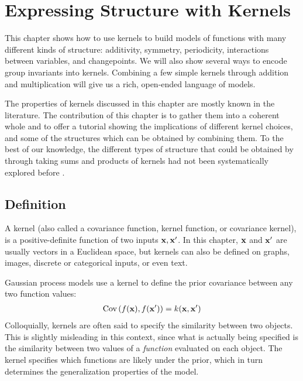 
\inbpdocument

\chapter{Expressing Structure with Kernels}
\label{ch:kernels}

This chapter shows how to use kernels to build models of functions with many different kinds of structure: additivity, symmetry, periodicity, interactions between variables, and changepoints.
We will also show several ways to encode group invariants into kernels.
Combining a few simple kernels through addition and multiplication will give us a rich, open-ended language of models.

The properties of kernels discussed in this chapter are mostly known in the literature.
The contribution of this chapter is to gather them into a coherent whole and to offer a tutorial showing the implications of different kernel choices, and some of the structures which can be obtained by combining them.
To the best of our knowledge, the different types of structure that could be obtained by through taking sums and products of kernels had not been systematically explored before \citet{DuvLloGroetal13}.


\section{Definition}

A kernel (also called a covariance function, kernel function, or covariance kernel), is a positive-definite function of two inputs ${\bf{x}}, {\bf{x}}'$. %
In this chapter, ${\bf{x}}$ and ${\bf{x}}'$ are usually vectors in a Euclidean space, but kernels can also be defined on graphs, images, discrete or categorical inputs, or even text.

Gaussian process models use a kernel to define the prior covariance between any two function values:
%
\begin{align}
\textrm{Cov}\left(f({\bf{x}}), f({\bf{x}}') \right) = k({\bf{x}},{\bf{x}}')
\end{align}
%
Colloquially, kernels are often said to specify the similarity between two objects.
This is slightly misleading in this context, since what is actually being specified is the similarity between two values of a \emph{function} evaluated on each object.
The kernel specifies which functions are likely under the \gp{} prior, which in turn determines the generalization properties of the model.





